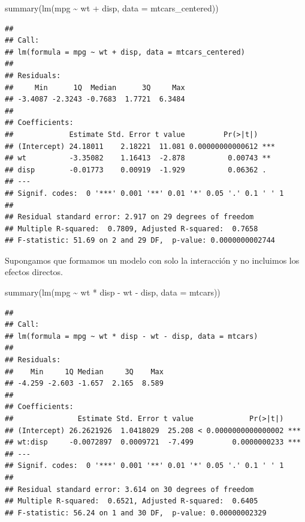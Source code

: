 \documentclass[
  12pt,
]{book}
\newenvironment{Shaded}{\begin{snugshade}}{\end{snugshade}}
\newcommand{\AttributeTok}[1]{\textcolor[rgb]{0.77,0.63,0.00}{#1}}
\newcommand{\FunctionTok}[1]{\textcolor[rgb]{0.00,0.00,0.00}{#1}}
\newcommand{\NormalTok}[1]{#1}
\newcommand{\SpecialCharTok}[1]{\textcolor[rgb]{0.00,0.00,0.00}{#1}}
\theoremstyle{definition}
\theoremstyle{definition}
\theoremstyle{definition}
\theoremstyle{remark}
\begin{document}
\begin{Shaded}
\begin{Highlighting}[]
\FunctionTok{summary}\NormalTok{(}\FunctionTok{lm}\NormalTok{(mpg }\SpecialCharTok{\textasciitilde{}}\NormalTok{ wt }\SpecialCharTok{+}\NormalTok{ disp, }\AttributeTok{data =}\NormalTok{ mtcars\_centered))}
\end{Highlighting}
\end{Shaded}

\begin{verbatim}
## 
## Call:
## lm(formula = mpg ~ wt + disp, data = mtcars_centered)
## 
## Residuals:
##     Min      1Q  Median      3Q     Max 
## -3.4087 -2.3243 -0.7683  1.7721  6.3484 
## 
## Coefficients:
##             Estimate Std. Error t value         Pr(>|t|)    
## (Intercept) 24.18011    2.18221  11.081 0.00000000000612 ***
## wt          -3.35082    1.16413  -2.878          0.00743 ** 
## disp        -0.01773    0.00919  -1.929          0.06362 .  
## ---
## Signif. codes:  0 '***' 0.001 '**' 0.01 '*' 0.05 '.' 0.1 ' ' 1
## 
## Residual standard error: 2.917 on 29 degrees of freedom
## Multiple R-squared:  0.7809, Adjusted R-squared:  0.7658 
## F-statistic: 51.69 on 2 and 29 DF,  p-value: 0.0000000002744
\end{verbatim}

Supongamos que formamos un modelo con solo la interacción y no incluimos los efectos directos.

\begin{Shaded}
\begin{Highlighting}[]
\FunctionTok{summary}\NormalTok{(}\FunctionTok{lm}\NormalTok{(mpg }\SpecialCharTok{\textasciitilde{}}\NormalTok{ wt }\SpecialCharTok{*}\NormalTok{ disp }\SpecialCharTok{{-}}\NormalTok{ wt }\SpecialCharTok{{-}}\NormalTok{ disp, }\AttributeTok{data =}\NormalTok{ mtcars))}
\end{Highlighting}
\end{Shaded}

\begin{verbatim}
## 
## Call:
## lm(formula = mpg ~ wt * disp - wt - disp, data = mtcars)
## 
## Residuals:
##    Min     1Q Median     3Q    Max 
## -4.259 -2.603 -1.657  2.165  8.589 
## 
## Coefficients:
##               Estimate Std. Error t value             Pr(>|t|)    
## (Intercept) 26.2621926  1.0418029  25.208 < 0.0000000000000002 ***
## wt:disp     -0.0072897  0.0009721  -7.499         0.0000000233 ***
## ---
## Signif. codes:  0 '***' 0.001 '**' 0.01 '*' 0.05 '.' 0.1 ' ' 1
## 
## Residual standard error: 3.614 on 30 degrees of freedom
## Multiple R-squared:  0.6521, Adjusted R-squared:  0.6405 
## F-statistic: 56.24 on 1 and 30 DF,  p-value: 0.00000002329
\end{verbatim}
\end{document}
